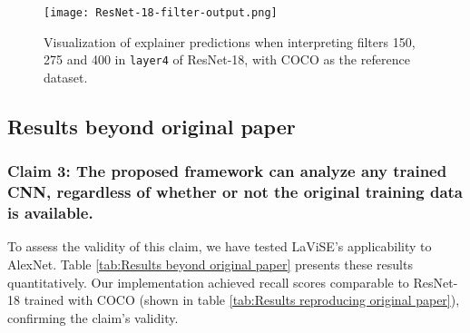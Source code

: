 \begin{figure}[hb!]
    \centering
    \texttt{[image: ResNet-18-filter-output.png]}
    \caption{Visualization of explainer predictions when interpreting filters 150, 275 and 400 in \texttt{layer4} of ResNet-18, with COCO as the reference dataset.}
    \label{fig:ResNet-18-filter-output}
\end{figure}

\subsection{Results beyond original paper} \label{sec:Results beyond original paper}

\subsubsection{Claim 3: The proposed framework can analyze any trained CNN, regardless of whether or not the original training data is available.}
To assess the validity of this claim, we have tested LaViSE's applicability to AlexNet. Table \ref{tab:Results beyond original paper} presents these results quantitatively. Our implementation achieved recall scores comparable to ResNet-18 trained with COCO (shown in table \ref{tab:Results reproducing original paper}), confirming the claim's validity.

